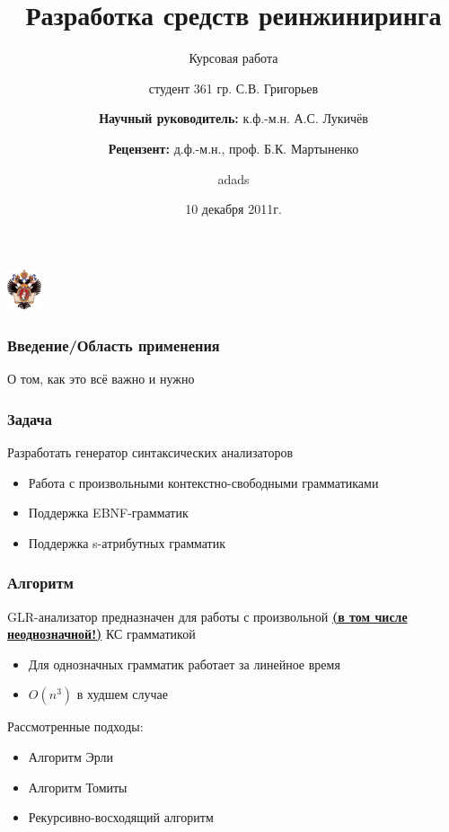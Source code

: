 \documentclass{beamer}
\title[РСР]{Разработка средств реинжиниринга}
\subtitle[курсовая]{Курсовая работа}
\institute[СПбГУ]{
Санкт-Петербургский государственный университет \\
Математико-Механический факультет \\
Кафедра системного программирования }
\author[С.В. Григорьев]{студент 361 гр. С.В. Григорьев \\
  \and  
  {\bfseries Научный руководитель:} к.ф.-м.н. А.С. Лукичёв \\ 
  \and
  {\bfseries Рецензент:} д.ф.-м.н., проф. Б.К. Мартыненко  
}
\date{10 декабря 2011г.}
\begin{document}
{

\begin{frame}
\begin{center}
{\includegraphics[width=1cm]{SPbGU_Logo.png}}
\end{center}
\titlepage
\end{frame}
}

\begin{frame}
    \transwipe[direction=90]
    \frametitle{Введение/Область применения}
    О том, как это всё важно и нужно
\end{frame}

\begin{frame}
    \transwipe[direction=90]
    \frametitle{Задача}
    Разработать генератор синтаксических анализаторов
    \begin{itemize}
        \item Работа с произвольными контекстно-свободными грамматиками
        \item Поддержка EBNF-грамматик
        \item Поддержка s-атрибутных грамматик
    \end{itemize}
\end{frame}

\begin{frame}
    \transwipe[direction=90]
    \frametitle{Алгоритм}
        \author[12]{adads}
     GLR-анализатор предназначен для работы с произвольной {\bfseries{\underline {(в том числе неоднозначной!)}}} КС  грамматикой
    \begin{itemize}
        \item Для однозначных грамматик работает за линейное время
    \item {$O(n^{3})$ в худшем случае}
    \end{itemize}
    Рассмотренные подходы:
    \begin{itemize}
            \item Алгоритм Эрли             
            \item Алгоритм Томиты               
            \item Рекурсивно-восходящий алгоритм                
    \end{itemize}                   
\end{frame}
\end{document}
